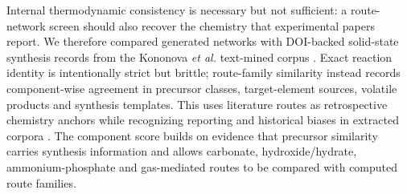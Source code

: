 \documentclass[11pt, letterpaper]{article}
\begin{document}
Internal thermodynamic consistency is necessary but not sufficient: a route-network screen should also recover the chemistry that experimental papers report. We therefore compared generated networks with DOI-backed solid-state synthesis records from the Kononova \textit{et al.} text-mined corpus \cite{kim2017synthesis_insights,kononova2019textmined,wang2022solution_synthesis}. Exact reaction identity is intentionally strict but brittle; route-family similarity instead records component-wise agreement in precursor classes, target-element sources, volatile products and synthesis templates. This uses literature routes as retrospective chemistry anchors while recognizing reporting and historical biases in extracted corpora \cite{jia2019anthropogenic_biases}. The component score builds on evidence that precursor similarity carries synthesis information \cite{he2020precursor_similarity,szymanski2023arrows3} and allows carbonate, hydroxide/hydrate, ammonium-phosphate and gas-mediated routes to be compared with computed route families.
\end{document}
